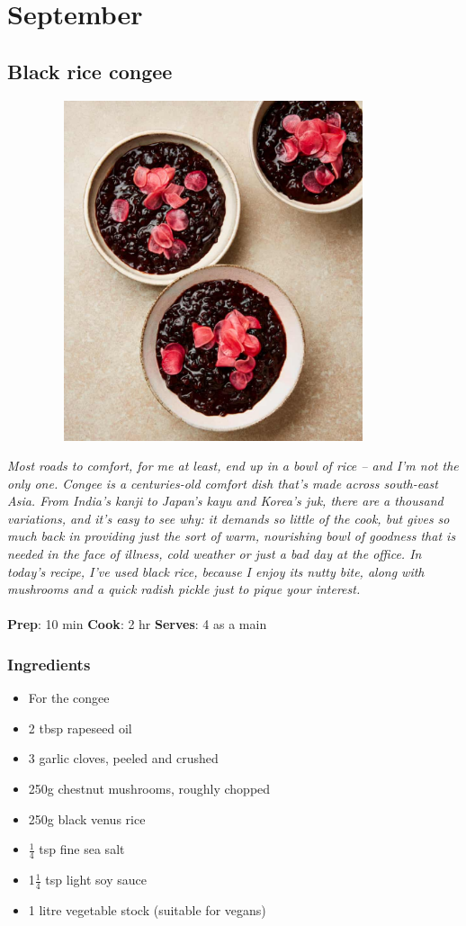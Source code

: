 \documentclass{book}
\begin{document}
\chapter{September}
\section{Black rice congee}
\begin{figure}
\centering\includegraphics[width=10cm,height=10cm,keepaspectratio]{Recipe_Pictures/Black_rice_congee.png}
\end{figure}
\emph{Most roads to comfort, for me at least, end up in a bowl of rice – and I’m not the only one. Congee is a centuries-old comfort dish that’s made across south-east Asia. From India’s kanji to Japan’s kayu and Korea’s juk, there are a thousand variations, and it’s easy to see why: it demands so little of the cook, but gives so much back in providing just the sort of warm, nourishing bowl of goodness that is needed in the face of illness, cold weather or just a bad day at the office. In today’s recipe, I’ve used black rice, because I enjoy its nutty bite, along with mushrooms and a quick radish pickle just to pique your interest.}\\\\ 
\textbf{Prep}: 10 min
\textbf{Cook}: 2 hr
\textbf{Serves}: 4 as a main
\subsection*{Ingredients}
\begin{itemize}
\item For the congee
\item 2 tbsp rapeseed oil
\item 3 garlic cloves, peeled and crushed
\item 250g chestnut mushrooms, roughly chopped
\item 250g black venus rice
\item $\frac{1}{4}$ tsp fine sea salt
\item 1$\frac{1}{4}$ tsp light soy sauce
\item 1 litre vegetable stock (suitable for vegans)
\end{itemize}
\end{document}
